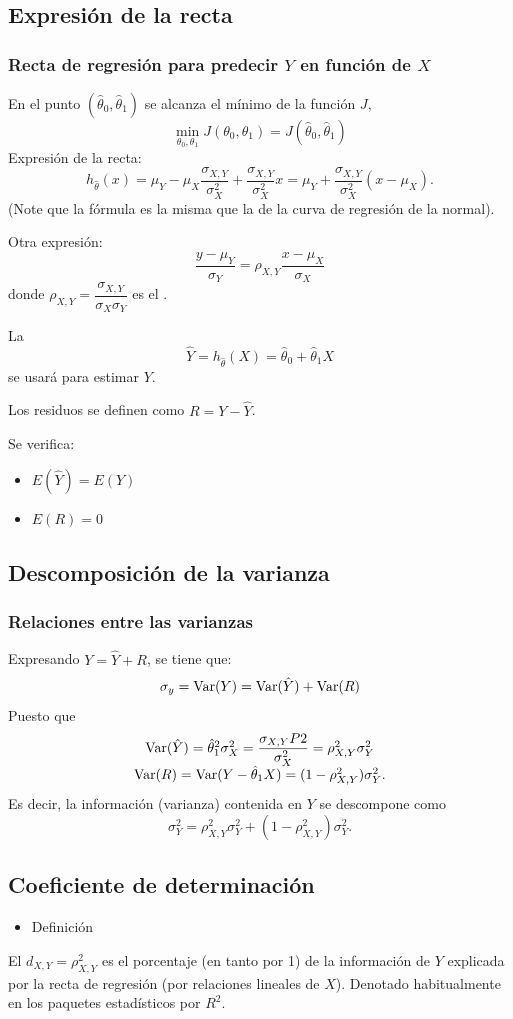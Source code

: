 \subsection{Expresión de la recta}
\subsubsection{Recta de regresión para predecir $Y$ en función de $X$}
En el punto $(\hat{\theta}_0,\hat{\theta}_1)$ se alcanza el mínimo de la función $J$, \[ \min_{\theta_0,\theta_1}J(\theta_0,\theta_1)=J(\hat{\theta}_0,\hat{\theta}_1) \]
Expresión de la recta: \[ h_{\hat{\theta}}(x)=\mu_Y-\mu_X\dfrac{\sigma_{X,Y}}{\sigma_X^2}+\dfrac{\sigma_{X,Y}}{\sigma_X^2}x=\mu_Y+\dfrac{\sigma_{X,Y}}{\sigma_X^2}(x-\mu_X). \] (Note que la fórmula es la misma que la de la curva de regresión de la normal).

Otra expresión: \[ \dfrac{y-\mu_Y}{\sigma_Y}=\rho_{X,Y}\dfrac{x-\mu_X}{\sigma_X} \]donde $\rho_{X,Y}=\dfrac{\sigma_{X,Y}}{\sigma_X\sigma_Y}$ es el .

La \va \[ \hat{Y}=h_{\hat{\theta}}(X)=\hat{\theta}_0+\hat{\theta}_1X \]se usará para estimar $Y$.

Los residuos se definen como $R=Y-\hat{Y}$.

Se verifica:
\begin{itemize}[label=\color{lightblue}$\to$]
\item $E(\hat{Y})=E(Y)$
\item $E(R)=0$
\end{itemize}
\subsection{Descomposición de la varianza}
\subsubsection{Relaciones entre las varianzas}
Expresando $Y=\hat{Y}+R$, se tiene que: \[ \sigma_y=\operatorname{Var}(Y)=\operatorname{Var}(\hat{Y})+\operatorname{Var}(R) \]
Puesto que \[ \begin{array}{c}
\operatorname{Var}(\hat{Y})=\hat{\theta}_1^2\sigma_X^2=\dfrac{\sigma_{X,Y}P2}{\sigma_X^2}=\rho_{X,Y}^2\sigma_Y^2\\
\operatorname{Var}(R)=\operatorname{Var}(Y-\hat{\theta}_1X)=(1-\rho_{X,Y}^2)\sigma_Y^2.
\end{array} \]
Es decir, la información (varianza) contenida en $Y$ se descompone como \[ \sigma_Y^2=\rho_{X,Y}^2\sigma_Y^2+(1-\rho_{X,Y}^2)\sigma_Y^2. \]
\subsection{Coeficiente de determinación}
\begin{itemize}[label=\color{red}\textbullet, leftmargin=*]
	\item \color{lightblue}Definición
\end{itemize}
El  $d_{X,Y}=\rho_{X,Y}^2$ es el porcentaje (en tanto por 1) de la información de $Y$ explicada por la recta de regresión (por relaciones lineales de $X$). Denotado habitualmente en los paquetes estadísticos por $R^2$.

